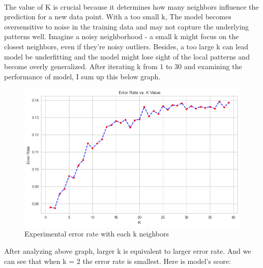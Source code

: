 \documentclass[a4paper]{report}
\begin{document}
	\paragraph{}
	
	The value of K is crucial because it determines how many neighbors influence the prediction for a new data point. With a too small k, The model becomes oversensitive to noise in the training data and may not capture the underlying patterns well. Imagine a noisy neighborhood - a small k might focus on the closest neighbors, even if they're noisy outliers. Besides, a too large k can lead model be underfitting and the model might lose sight of the local patterns and become overly generalized. After iterating k from 1 to 30 and examining the performance of model, I sum up this below graph.\\
	
	
	\begin{figure}[th]
		\centering
		\includegraphics[scale=0.6]{error_rate.png}
		\caption{Experimental error rate with each k neighbors}
		\label{fig:enter-label}
	\end{figure}
	
	After analyzing above graph, larger k is equivalent to larger error rate. And we can see that when k = 2 the error rate is smallest. Here is model's score:
	
\end{document}
